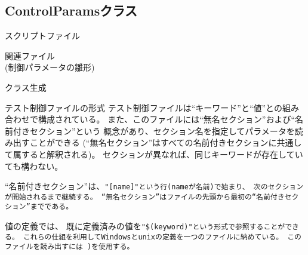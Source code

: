 
\subsection{ControlParamsクラス}
\label{subsec:ControlParams}

\begin{Description}{スクリプトファイル}
\end{Description}

\medskip
\begin{Description}{関連ファイル}
	\\
	\Hskip{5pt}
		{\small (制御パラメータの雛形)}
\end{Description}

\medskip
\begin{Description}{クラス生成}
	\begin{Args}
	\end{Args}
\end{Description}

\medskip
\begin{Description}{テスト制御ファイルの形式}
	テスト制御ファイルは``キーワード''と``値''との組み合わせで構成されている。
	また、このファイルには``無名セクション''および``名前付きセクション''という
	概念があり、セクション名を指定してパラメータを読み出すことができる
	(``無名セクション''はすべての名前付きセクションに共通して属すると解釈される)。
	セクションが異なれば、同じキーワードが存在していても構わない。

	``名前付きセクション''は、\tt{"[name]"}という行(\tt{name}が名前)で始まり、
	次のセクションが開始されるまで継続する。
	``無名セクション''はファイルの先頭から最初の``名前付きセクション''までである。

	値の定義では、
	既に定義済みの値を\tt{"\$(keyword)"}という形式で参照することができる。
	これらの仕組を利用してWindowsとunixの定義を一つのファイルに納めている。
	このファイルを読み出すには
	)を使用する。
\end{Description}

